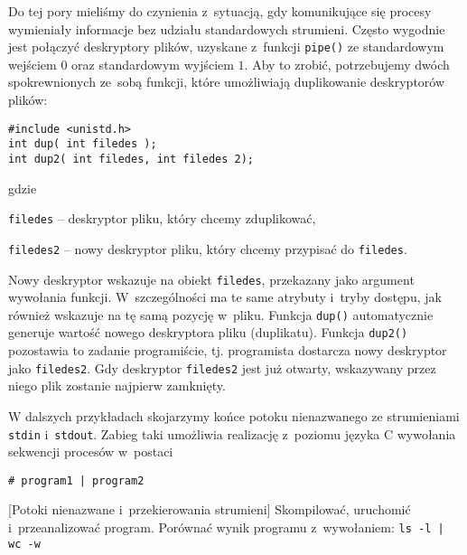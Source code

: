 Do tej pory mieliśmy do czynienia z~sytuacją, gdy komunikujące się procesy
wymieniały informacje bez udziału standardowych strumieni. Często wygodnie jest
połączyć deskryptory plików, uzyskane z~funkcji \texttt{pipe()} ze standardowym
wejściem $0$ oraz standardowym wyjściem $1$. Aby to zrobić, potrzebujemy dwóch
spokrewnionych ze~sobą funkcji, które umożliwiają duplikowanie deskryptorów
plików:
\begin{lstlisting}[style=MyCStyle]
#include <unistd.h>
int dup( int filedes );
int dup2( int filedes, int filedes 2);
\end{lstlisting}
gdzie
\begin{myitemize}
  \item \texttt{filedes} -- deskryptor pliku, który chcemy zduplikować,
  \item \texttt{filedes2} -- nowy deskryptor pliku, który chcemy przypisać do \texttt{filedes}.
\end{myitemize}

Nowy deskryptor wskazuje na obiekt \texttt{filedes}, przekazany jako argument
wywołania funkcji. W~szczególności ma te same atrybuty i~tryby dostępu, jak
również wskazuje na tę samą pozycję w~pliku. Funkcja \texttt{dup()}
automatycznie generuje wartość nowego deskryptora pliku (duplikatu). Funkcja
\texttt{dup2()} pozostawia to zadanie programiście, tj. programista dostarcza
nowy deskryptor jako \texttt{filedes2}. Gdy deskryptor \texttt{filedes2} jest
już otwarty, wskazywany przez niego plik zostanie najpierw zamknięty.

W dalszych przykładach skojarzymy końce potoku nienazwanego ze strumieniami
\texttt{stdin} i~\texttt{stdout}. Zabieg taki umożliwia realizację z~poziomu
języka C wywołania sekwencji procesów w~postaci
\begin{lstlisting}[style=MyBashStyle]
# program1 | program2
\end{lstlisting}

\begin{example}{[Potoki nienazwane i~przekierowania strumieni]}
  Skompilować, uruchomić i~przeanalizować program. Porównać wynik programu
  z~wywołaniem: \texttt{ls -l | wc -w}
  
\end{example}

